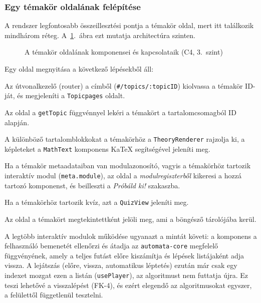 \subsubsection{Egy témakör oldalának felépítése}

A rendszer legfontosabb összeillesztési pontja a témakör oldal, mert itt
találkozik mindhárom réteg. A~\ref{fig:arch-topic}.~ábra ezt mutatja
architectúra szinten.

\begin{figure}[H]
    \centering
    \resizebox{\textwidth}{!}{}
    \caption{A témakör oldalának komponensei és kapcsolataik (C4, 3.~szint)}
    \label{fig:arch-topic}
\end{figure}

Egy oldal megnyitása a következő lépésekből áll:
\begin{compactenum}
    \item Az útvonalkezelő (router) a címből (\texttt{\#/topics/:topicID})
          kiolvassa a témakör ID-ját, és megjeleníti a
          \texttt{Topicpages} oldalt.
    \item Az oldal a \texttt{getTopic} függvénnyel lekéri a témakört a
          tartalomcsomagból ID alapján.
    \item A különböző tartalomblokkokat a témakörhöz a \texttt{TheoryRenderer} rajzolja ki, a
          képleteket a \texttt{MathText} komponens KaTeX segítségével jeleníti meg.
    \item Ha a témakör metaadataiban van modulazonosító, vagyis a témakörhöz tartozik interaktív modul
          (\texttt{meta.module}), az oldal a \emph{modulregiszterből}
          kikeresi a hozzá tartozó komponenst, és beilleszti a
          \emph{Próbáld ki!} szakaszba.
    \item Ha a témakörhöz tartozik kvíz, azt a \texttt{QuizView} jeleníti meg.
    \item Az oldal a témakört megtekintettként jelöli meg, ami a böngésző
          tárolójába kerül.
\end{compactenum}

A legtöbb interaktív modulok működése ugyanazt a mintát követi: a
komponens a felhasználó bemenetét ellenőrzi és átadja az
\texttt{automata-core} megfelelő függvényének, amely a teljes futást
előre kiszámítja és lépések listájaként adja vissza. A lejátszás
(előre, vissza, automatikus léptetés) ezután már csak egy indexet mozgat
ezen a listán (\texttt{usePlayer}), az algoritmust nem futtatja újra.
Ez teszi lehetővé a visszalépést (FK-4), és ezért elegendő az
algoritmusokat egyszer, a felülettől függetlenül tesztelni.

